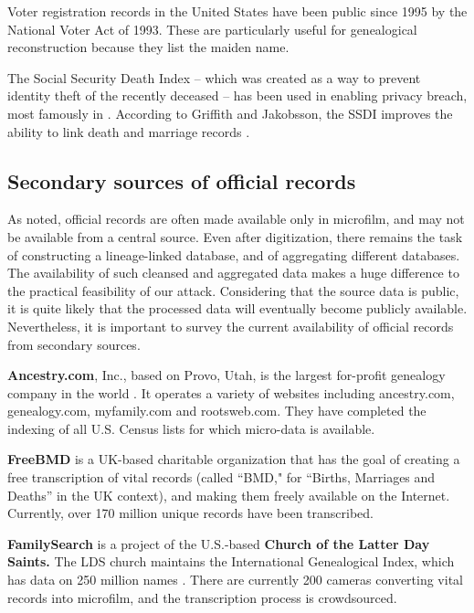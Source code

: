 \documentclass{article}
\begin{document}
Voter registration records in the United States have been public since 1995 by the National Voter Act of 1993. These are particularly useful for genealogical reconstruction because they list the maiden name. 

The Social Security Death Index -- which was created as a way to prevent identity theft of the recently deceased -- has been used in enabling privacy breach, most famously in \cite{acquisti-ssn}. According to Griffith and Jakobsson, the SSDI improves the ability to link death and marriage records \cite{messing}.

\subsection{Secondary sources of official records}

As noted, official records are often made available only in microfilm, and may not be available from a central source. Even after digitization, there remains the task of constructing a lineage-linked database, and of aggregating different databases. The availability of such cleansed and aggregated data makes a huge difference to the practical feasibility of our attack. Considering that the source data is public, it is quite likely that the processed data will eventually become publicly available. Nevertheless, it is important to survey the current availability of official records from secondary sources.

{\bf Ancestry.com}, Inc., based on Provo, Utah, is the largest for-profit genealogy company in the world \cite{wp-ancestry.com}. It operates a variety of websites including ancestry.com, genealogy.com, myfamily.com and rootsweb.com. They have completed the indexing of all U.S. Census lists for which micro-data is available. 

{\bf FreeBMD} is a UK-based charitable organization that has the goal of creating a free transcription of vital records (called ``BMD," for ``Births, Marriages and Deaths'' in the UK context), and making them freely available on the Internet.  Currently, over 170 million unique records have been transcribed.

{\bf FamilySearch} is a project of the U.S.-based {\bf Church of the  Latter Day Saints.} The LDS church maintains the International Genealogical Index, which has data on 250 million names \cite{familysearch}. There are currently 200 cameras converting vital records into microfilm, and the transcription process is crowdsourced. 
\end{document}
